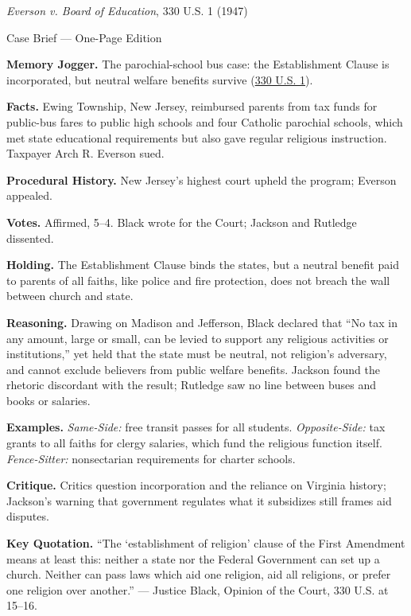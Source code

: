 \documentclass[12pt]{article}
\begin{document}
\begin{center}
{\Large \textit{Everson v. Board of Education}, 330 U.S. 1 (1947)\par}
\vspace{0.3em}
{\normalsize Case Brief --- One-Page Edition\par}
\end{center}

\textbf{Memory Jogger.} The parochial-school bus case: the Establishment Clause is incorporated, but neutral welfare benefits survive (\href{https://supreme.justia.com/cases/federal/us/330/1/}{330 U.S. 1}).

\textbf{Facts.} Ewing Township, New Jersey, reimbursed parents from tax funds for public-bus fares to public high schools and four Catholic parochial schools, which met state educational requirements but also gave regular religious instruction. Taxpayer Arch R. Everson sued.

\textbf{Procedural History.} New Jersey's highest court upheld the program; Everson appealed.

\textbf{Votes.} Affirmed, 5--4. Black wrote for the Court; Jackson and Rutledge dissented.

\textbf{Holding.} The Establishment Clause binds the states, but a neutral benefit paid to parents of all faiths, like police and fire protection, does not breach the wall between church and state.

\textbf{Reasoning.} Drawing on Madison and Jefferson, Black declared that ``No tax in any amount, large or small, can be levied to support any religious activities or institutions,'' yet held that the state must be neutral, not religion's adversary, and cannot exclude believers from public welfare benefits. Jackson found the rhetoric discordant with the result; Rutledge saw no line between buses and books or salaries.

\textbf{Examples.} \emph{Same-Side:} free transit passes for all students. \emph{Opposite-Side:} tax grants to all faiths for clergy salaries, which fund the religious function itself. \emph{Fence-Sitter:} nonsectarian requirements for charter schools.

\textbf{Critique.} Critics question incorporation and the reliance on Virginia history; Jackson's warning that government regulates what it subsidizes still frames aid disputes.

\textbf{Key Quotation.} ``The `establishment of religion' clause of the First Amendment means at least this: neither a state nor the Federal Government can set up a church. Neither can pass laws which aid one religion, aid all religions, or prefer one religion over another.'' --- Justice Black, Opinion of the Court, 330 U.S. at 15--16.
\end{document}
